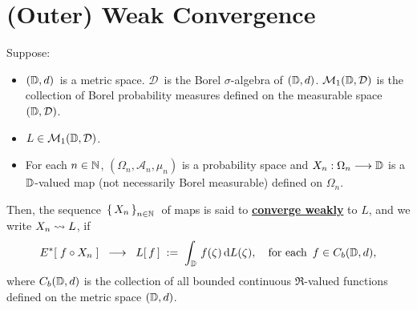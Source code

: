 

\section{(Outer) Weak Convergence}
\setcounter{theorem}{0}
\setcounter{equation}{0}


\renewcommand{\theenumi}{\roman{enumi}}
\renewcommand{\labelenumi}{\textnormal{(\theenumi)}$\;\;$}


\begin{definition}
\mbox{}
\vskip -0.3cm
\noindent
Suppose:
\begin{itemize}
\item
	$(\mathbb{D},d)$\, is a metric space.
	$\mathcal{D}$\, is the Borel $\sigma$-algebra of $(\mathbb{D},d)$.
	\vskip 0.0cm
	$\mathcal{M}_{1}(\mathbb{D},\mathcal{D})$ is the collection of Borel probability measures
	defined on the measurable space $(\mathbb{D},\mathcal{D})$.
\item
	$L \in \mathcal{M}_{1}(\mathbb{D},\mathcal{D})$.
\item
	For each $n \in \mathbb{N}$,
	$(\Omega_{n},\mathcal{A}_{n},\mu_{n})$ is a probability space and
	$X_{n} : \Omega_{n} \longrightarrow \mathbb{D}$
	is a $\mathbb{D}$-valued map (not necessarily Borel measurable) defined on $\Omega_{n}$.
\end{itemize}
Then, the sequence \,$\left\{\,X_{n}\,\right\}_{n\in\mathbb{N}}$\, of maps is said to
\underline{\textbf{converge weakly}} to $L$, and we write $X_{n} \rightsquigarrow L$, if
\begin{equation*}
E^{*}\!\left[\; f \circ X_{n} \;\right]
\;\; \longrightarrow \;\;
	L\!\left[\,f\,\right] \; := \; \int_{\mathbb{D}}\, f(\zeta)\, \textnormal{d} L(\zeta),
	\quad
	\textnormal{for each \,$f \in C_{b}(\mathbb{D},d)$},
\end{equation*}
where $C_{b}(\mathbb{D},d)$ is the collection of all bounded continuous $\Re$-valued
functions defined on the metric space $(\mathbb{D},d)$.
\end{definition}


\renewcommand{\theenumi}{\roman{enumi}}
\renewcommand{\labelenumi}{\textnormal{(\theenumi)}$\;\;$}

